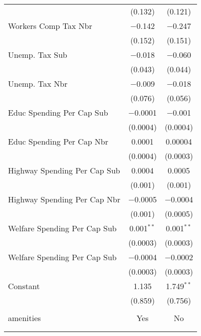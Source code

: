 \begin{table}[!htbp]
\begin{tabular}{@{\extracolsep{5pt}}lcc}
  & (0.132) & (0.121) \\ 
  Workers Comp Tax Nbr & $-$0.142 & $-$0.247 \\ 
  & (0.152) & (0.151) \\ 
  Unemp. Tax Sub & $-$0.018 & $-$0.060 \\ 
  & (0.043) & (0.044) \\ 
  Unemp. Tax Nbr & $-$0.009 & $-$0.018 \\ 
  & (0.076) & (0.056) \\ 
  Educ Spending Per Cap Sub & $-$0.0001 & $-$0.001 \\ 
  & (0.0004) & (0.0004) \\ 
  Educ Spending Per Cap Nbr & 0.0001 & 0.00004 \\ 
  & (0.0004) & (0.0003) \\ 
  Highway Spending Per Cap Sub & 0.0004 & 0.0005 \\ 
  & (0.001) & (0.001) \\ 
  Highway Spending Per Cap Nbr & $-$0.0005 & $-$0.0004 \\ 
  & (0.001) & (0.0005) \\ 
  Welfare Spending Per Cap Sub & 0.001$^{**}$ & 0.001$^{**}$ \\ 
  & (0.0003) & (0.0003) \\ 
  Welfare Spending Per Cap Sub & $-$0.0004 & $-$0.0002 \\ 
  & (0.0003) & (0.0003) \\ 
  Constant & 1.135 & 1.749$^{**}$ \\ 
  & (0.859) & (0.756) \\ 
 \hline \\[-1.8ex] 
amenities & Yes & No \\ 
\hline \\[-1.8ex] 
\hline 
\hline \\[-1.8ex] 
\end{tabular} 
\end{table} 
